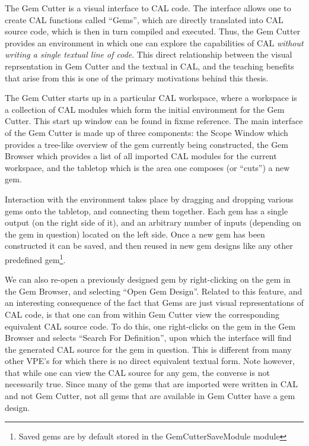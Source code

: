 The Gem Cutter is a visual interface to CAL code.  The interface allows one to create CAL functions called ``Gems'', which are directly translated into CAL source code, which is then in turn compiled and executed.  Thus, the Gem Cutter provides an environment in which one can explore the capabilities of CAL \emph{without writing a single textual line of code}.  This direct relationship between the visual reprsentation in Gem Cutter and the textual in CAL, and the teaching benefits that arise from this is one of the primary motivations behind this thesis.

The Gem Cutter starts up in a particular CAL workspace, where a workspace is a collection of CAL modules which form the initial environment for the Gem Cutter.  This start up window can be found in fixme reference.  The main interface of the Gem Cutter is made up of three components: the Scope Window which provides a tree-like overview of the gem currently being constructed, the Gem Browser which provides a list of all imported CAL modules for the current workspace, and the tabletop which is the area one composes (or ``cuts'') a new gem.

Interaction with the environment takes place by dragging and dropping various gems onto the tabletop, and connecting them together.  Each gem has a single output (on the right side of it), and an arbitrary number of inputs (depending on the gem in question) located on the left side.  Once a new gem has been constructed it can be saved, and then reused in new gem designs like any other predefined gem\footnote{Saved gems are by default stored in the GemCutterSaveModule module}.

We can also re-open a previously designed gem by right-clicking on the gem in the Gem Browser, and selecting ``Open Gem Design''.  Related to this feature, and an interesting consequence of the fact that Gems are just visual representations of CAL code, is that one can from within Gem Cutter view the corresponding equivalent CAL source code.  To do this, one right-clicks on the gem in the Gem Browser and selects ``Search For Definition'', upon which the interface will find the generated CAL source for the gem in question.  This is different from many other VPE's for which there is no direct equivalent textual form.  Note however, that while one can view the CAL source for any gem, the converse is not necessarily true.  Since many of the gems that are imported were written in CAL and not Gem Cutter, not all gems that are available in Gem Cutter have a gem design.



